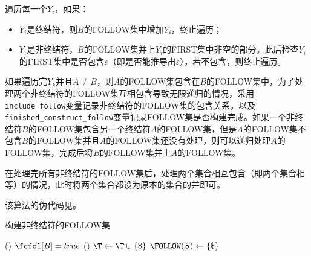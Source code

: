\documentclass[lang=cn,11pt,a4paper,cite=authornum]{paper}
\begin{document}
遍历每一个$Y_i$，如果：

\begin{itemize}
    \item $Y_i$是终结符，则$B$的FOLLOW集中增加$Y_i$，终止遍历；
    \item $Y_i$是非终结符，$B$的FOLLOW集并上$Y_i$的FIRST集中非空的部分。此后检查$Y_i$的FIRST集中是否包含$\varepsilon$（即是否能推导出$\varepsilon$），若不包含，则终止遍历。
\end{itemize}

如果遍历完$Y_k$并且$A\not=B$，则$A$的FOLLOW集包含在$B$的FOLLOW集中，为了处理两个非终结符的FOLLOW集互相包含导致无限递归的情况，采用\texttt{include_follow}变量记录非终结符的FOLLOW集的包含关系，以及\texttt{finished_construct_follow}变量记录FOLLOW集是否构建完成。如果一个非终结符$B$的FOLLOW集包含另一个终结符$A$的FOLLOW集，但是$A$的FOLLOW集不包含$B$的FOLLOW集并且$A$的FOLLOW集还没有处理，则可以递归处理$A$的FOLLOW集，完成后将$B$的FOLLOW集并上$A$的FOLLOW集。

在处理完所有非终结符的FOLLOW集后，处理两个集合相互包含（即两个集合相等）的情况，此时将两个集合都设为原本的集合的并即可。

该算法的伪代码见。

\begin{algorithm}[!htb]
    \caption{构建非终结符的FOLLOW集\label{algo:cons_follow}}
    \Fn(){}{
        $\fcfol[B]=true$\;
    }
    \Fn(){\ConsFolSet{}}{
        $\T\leftarrow\T\cup\{\$\}$\;
        $\FOLLOW(S)\leftarrow\{\$\}$\;
    }
\end{algorithm}
\end{document}
